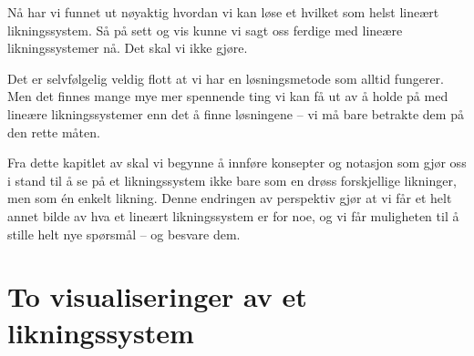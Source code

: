 

\label{ch:vektorer}

Nå har vi funnet ut nøyaktig hvordan vi kan løse et hvilket som helst
lineært likningssystem.  Så på sett og vis kunne vi sagt oss ferdige
med lineære likningssystemer nå.  Det skal vi ikke gjøre.

Det er selvfølgelig veldig flott at vi har en løsningsmetode som
alltid fungerer.  Men det finnes mange mye mer spennende ting vi kan
få ut av å holde på med lineære likningssystemer enn det å finne
løsningene -- vi må bare betrakte dem på den rette måten.

Fra dette kapitlet av skal vi begynne å innføre konsepter og notasjon
som gjør oss i stand til å se på et likningssystem ikke bare som en
drøss forskjellige likninger, men som én enkelt likning.  Denne
endringen av perspektiv gjør at vi får et helt annet bilde av hva et
lineært likningssystem er for noe, og vi får muligheten til å stille
helt nye spørsmål -- og besvare dem.


\section*{To visualiseringer av et likningssystem}

